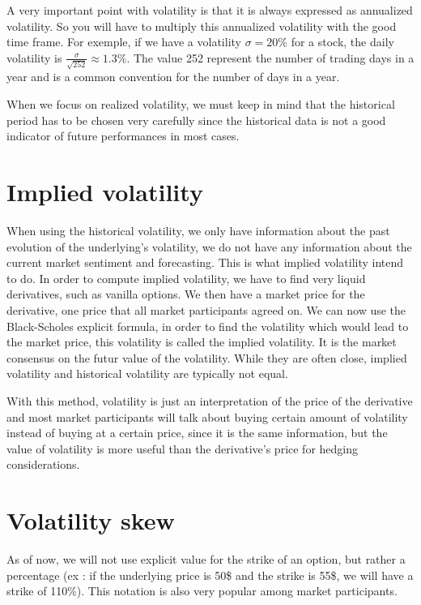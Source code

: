 \documentclass[hidelinks]{article}
\theoremstyle{definition}
\begin{document}
A very important point with volatility is that it is always expressed as annualized volatility. So you will have to multiply this annualized volatility with the good time frame. For exemple, if we have a volatility $\sigma =20\%$ for a stock, the daily volatility is $\frac{\sigma}{\sqrt{252}} \approx 1.3 \%$. The value 252 represent the number of trading days in a year and is a common convention for the number of days in a year.

When we focus on realized volatility, we must keep in mind that the historical period has to be chosen very carefully since the historical data is not a good indicator of future performances in most cases.

\section{Implied volatility}

When using the historical volatility, we only have information about the past evolution of the underlying's volatility, we do not have any information about the current market sentiment and forecasting. This is what implied volatility intend to do. In order to compute implied volatility, we have to find very liquid derivatives, such as vanilla options. We then have a market price for the derivative, one price that all market participants agreed on. We can now use the Black-Scholes explicit formula, in order to find the volatility which would lead to the market price, this volatility is called the implied volatility. It is the market consensus on the futur value of the volatility. While they are often close, implied volatility and historical volatility are typically not equal. 

With this method, volatility is just an interpretation of the price of the derivative and most market participants will talk about buying certain amount of volatility instead of buying at a certain price, since it is the same information, but the value of volatility is more useful than the derivative's price for hedging considerations.

\section{Volatility skew}

As of now, we will not use explicit value for the strike of an option, but rather a percentage (ex : if the underlying price is 50\$ and the strike is 55\$, we will have a strike of 110\%). This notation is also very popular among market participants. 
\end{document}
